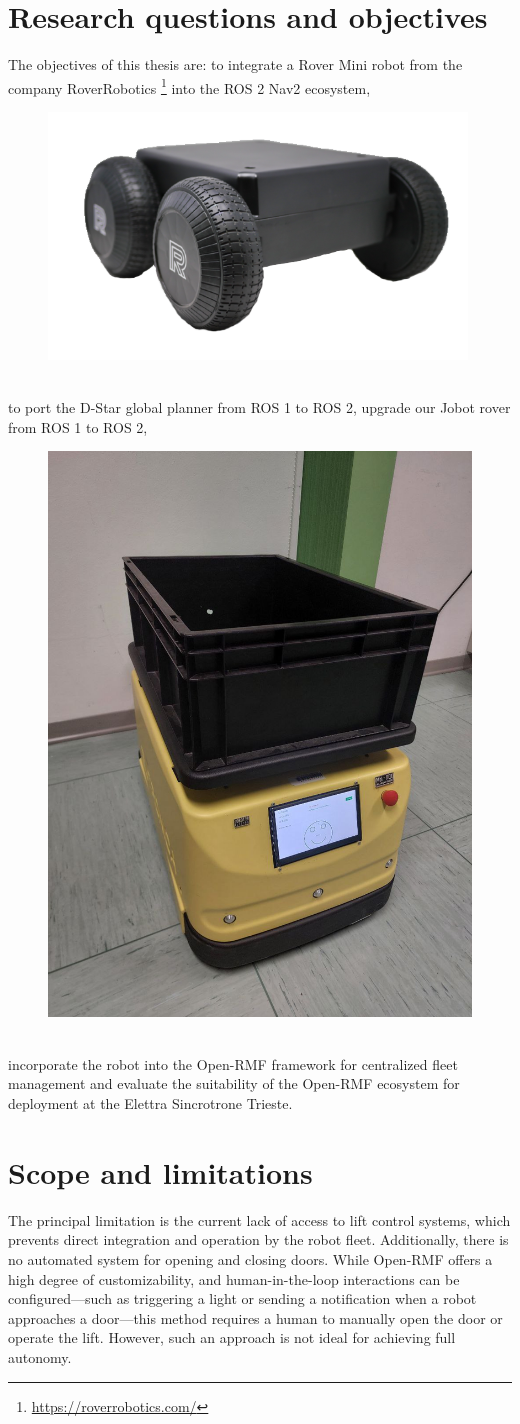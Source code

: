 \chapter{Research questions and objectives}
The objectives of this thesis are: to integrate a Rover Mini robot from the company RoverRobotics \footnote{\href{https://roverrobotics.com/}{https://roverrobotics.com/}}
into the ROS 2 Nav2 ecosystem,\\
\begin{figure}[h]
	\centering
	\includegraphics[width=0.4\linewidth]{img/RoverRoboticsMini.png}
	\label{fig:RoverRobotics Rover Mini}
\end{figure}\\
to port the D-Star global planner from ROS 1 to ROS 2,
upgrade our Jobot rover from ROS 1 to ROS 2,\\
\begin{figure}[h]
	\centering
	\includegraphics[width=0.3\linewidth]{img/jobot_robot.jpg}
	\label{fig:Jobot Rover}
\end{figure}\\
incorporate the robot into the Open-RMF framework for centralized fleet management and evaluate the suitability of the Open-RMF ecosystem for deployment at the Elettra Sincrotrone Trieste.
\chapter{Scope and limitations}
The principal limitation is the current lack of access to lift control systems, which prevents direct integration and operation by the robot fleet. Additionally, there is no automated system for opening and closing doors. While Open-RMF offers a high degree of customizability, and human-in-the-loop interactions can be configured—such as triggering a light or sending a notification when a robot approaches a door—this method requires a human to manually open the door or operate the lift. However, such an approach is not ideal for achieving full autonomy.
